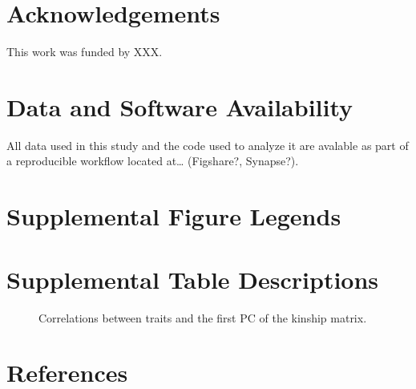 \documentclass[10pt,letterpaper]{article}
\begin{document}
\hypertarget{acknowledgements}{%
\section{Acknowledgements}\label{acknowledgements}}

This work was funded by XXX.

\hypertarget{data-and-software-availability}{%
\section{Data and Software
Availability}\label{data-and-software-availability}}

All data used in this study and the code used to analyze it are avalable
as part of a reproducible workflow located at\ldots{} (Figshare?,
Synapse?).

\hypertarget{supplemental-figure-legends}{%
\section{Supplemental Figure
Legends}\label{supplemental-figure-legends}}

\begin{figure}[ht]
\centering
\caption{
}
\label{fig:trait_cor}
\end{figure}

\hypertarget{supplemental-table-descriptions}{%
\section{Supplemental Table
Descriptions}\label{supplemental-table-descriptions}}

\begin{figure}[ht]
\centering
\caption{Correlations between traits and the first PC of the kinship matrix.
}
\label{table:trait_cor}
\end{figure}

\hypertarget{references}{%
\section*{References}\label{references}}

\nolinenumbers
\end{document}
